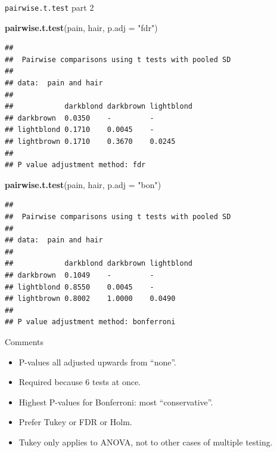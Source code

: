 \documentclass[ignorenonframetext,]{beamer}
\newenvironment{Shaded}{\begin{snugshade}}{\end{snugshade}}
\newcommand{\DataTypeTok}[1]{\textcolor[rgb]{0.13,0.29,0.53}{#1}}
\newcommand{\KeywordTok}[1]{\textcolor[rgb]{0.13,0.29,0.53}{\textbf{#1}}}
\newcommand{\NormalTok}[1]{#1}
\newcommand{\StringTok}[1]{\textcolor[rgb]{0.31,0.60,0.02}{#1}}
\begin{document}
\begin{frame}[fragile]{\texttt{pairwise.t.test} part 2}
\protect\hypertarget{pairwise.t.test-part-2}{}

\tiny

\begin{Shaded}
\begin{Highlighting}[]
\KeywordTok{pairwise.t.test}\NormalTok{(pain, hair, }\DataTypeTok{p.adj =} \StringTok{"fdr"}\NormalTok{)}
\end{Highlighting}
\end{Shaded}

\begin{verbatim}
## 
##  Pairwise comparisons using t tests with pooled SD 
## 
## data:  pain and hair 
## 
##            darkblond darkbrown lightblond
## darkbrown  0.0350    -         -         
## lightblond 0.1710    0.0045    -         
## lightbrown 0.1710    0.3670    0.0245    
## 
## P value adjustment method: fdr
\end{verbatim}

\begin{Shaded}
\begin{Highlighting}[]
\KeywordTok{pairwise.t.test}\NormalTok{(pain, hair, }\DataTypeTok{p.adj =} \StringTok{"bon"}\NormalTok{)}
\end{Highlighting}
\end{Shaded}

\begin{verbatim}
## 
##  Pairwise comparisons using t tests with pooled SD 
## 
## data:  pain and hair 
## 
##            darkblond darkbrown lightblond
## darkbrown  0.1049    -         -         
## lightblond 0.8550    0.0045    -         
## lightbrown 0.8002    1.0000    0.0490    
## 
## P value adjustment method: bonferroni
\end{verbatim}

\normalsize

\end{frame}

\begin{frame}{Comments}
\protect\hypertarget{comments-15}{}

\begin{itemize}
\item
  P-values all adjusted upwards from ``none''.
\item
  Required because 6 tests at once.
\item
  Highest P-values for Bonferroni: most ``conservative''.
\item
  Prefer Tukey or FDR or Holm.
\item
  Tukey only applies to ANOVA, not to other cases of multiple testing.
\end{itemize}

\end{frame}
\end{document}
